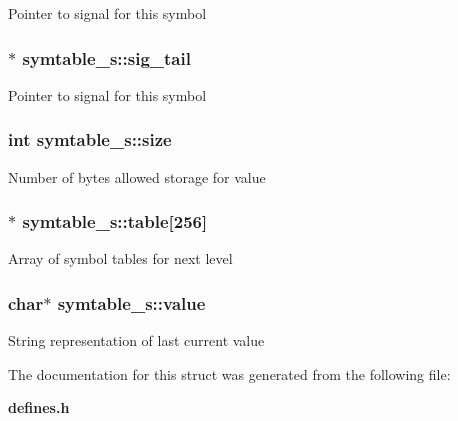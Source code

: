 Pointer to signal for this symbol 
\subsubsection{$\ast$ {\bf symtable\_\-s::sig\_\-tail}}\label{structsymtable__s_o1}


Pointer to signal for this symbol 
\subsubsection{\setlength{\rightskip}{0pt plus 5cm}int {\bf symtable\_\-s::size}}\label{structsymtable__s_o5}


Number of bytes allowed storage for value 
\subsubsection{$\ast$ {\bf symtable\_\-s::table}[256]}\label{structsymtable__s_o6}


Array of symbol tables for next level 
\subsubsection{\setlength{\rightskip}{0pt plus 5cm}char$\ast$ {\bf symtable\_\-s::value}}\label{structsymtable__s_o4}


String representation of last current value 

The documentation for this struct was generated from the following file:\begin{CompactItemize}
\item 
{\bf defines.h}\end{CompactItemize}
